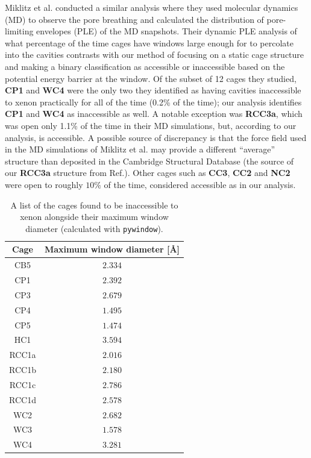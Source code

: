 \documentclass[journal=jacsat,manuscript=article]{achemso}
\begin{document}
Miklitz et al.\cite{miklitz2017computational} conducted a similar analysis where they used molecular dynamics (MD) to observe the pore breathing and calculated the distribution of pore-limiting envelopes (PLE) of the MD snapshots. Their dynamic PLE analysis of what percentage of the time cages have windows large enough for  to percolate into the cavities contrasts with our method of focusing on a static cage structure and making a binary classification as accessible or inaccessible based on the potential energy barrier at the window. Of the subset of 12 cages they studied, \textbf{CP1} and \textbf{WC4} were the only two they identified as having cavities inaccessible to xenon practically for all of the time (0.2\% of the time); our analysis identifies \textbf{CP1} and \textbf{WC4} as inaccessible as well. A notable exception was \textbf{RCC3a}, which was open only 1.1\% of the time in their MD simulations, but, according to our analysis, is accessible. A possible source of discrepancy is that the force field used in the MD simulations of Miklitz et al.\cite{miklitz2017computational} may provide a different ``average'' structure than deposited in the Cambridge Structural Database (the source of our \textbf{RCC3a} structure from Ref.\cite{miklitz2017computational}). Other cages such as \textbf{CC3}, \textbf{CC2} and \textbf{NC2} were open to  roughly $10 \%$ of the time, considered accessible as in our analysis. 

\begin{table}
  \caption{A list of the cages found to be inaccessible to xenon alongside their maximum window diameter (calculated with \texttt{pywindow}).}
  \label{tbl:inaccessible}
  \begin{tabular}{cc}
    \hline
    \textbf{Cage}  & \textbf{Maximum window diameter [\AA]}  \\
    \hline
    CB5 & $2.334$ \\
    CP1 & $2.392$ \\
    CP3 & $2.679$ \\
    CP4 & $1.495$ \\
	CP5 & $1.474$ \\
    HC1 & $3.594$ \\
    RCC1a & $2.016$ \\
    RCC1b & $2.180$ \\
    RCC1c & $2.786$ \\
	RCC1d & $2.578$ \\
	WC2 & $2.682$ \\
	WC3 & $1.578$ \\
	WC4 & $3.281$ \\
    \hline
  \end{tabular}
\end{table}
\end{document}
